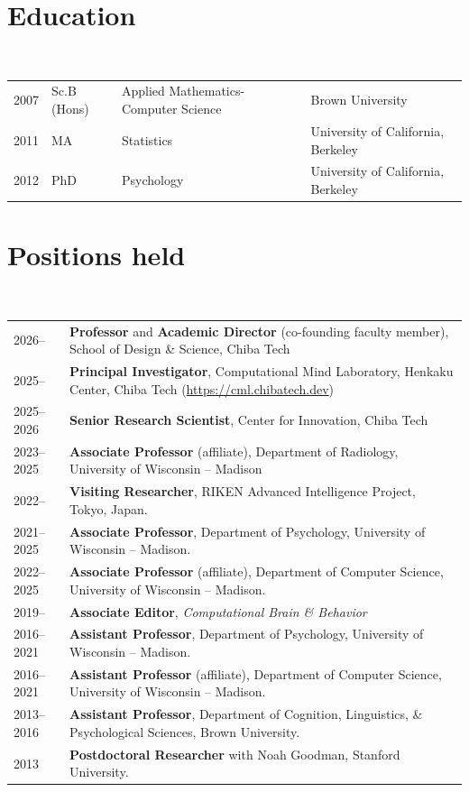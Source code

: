 \documentclass[a4paper,10pt]{article}
\begin{document}
\maketitle

\section{Education}

~\begin{tabular}{llll}
2007 & Sc.B (Hons) & Applied Mathematics-Computer Science & Brown University\\
2011 & MA & Statistics & University of California, Berkeley\\
2012 & PhD & Psychology & University of California, Berkeley
\end{tabular}


\section{Positions held}

~\begin{tabular}{lP{15cm}}
2026-- & \textbf{Professor} and \textbf{Academic Director} (co-founding faculty member), School of Design \& Science, Chiba Tech \\
2025-- & \textbf{Principal Investigator}, Computational Mind Laboratory, Henkaku Center, Chiba Tech (\url{https://cml.chibatech.dev}) \\
2025--2026 & \textbf{Senior Research Scientist}, Center for Innovation, Chiba Tech \\
2023--2025 & \textbf{Associate Professor} (affiliate), Department of Radiology, University of Wisconsin -- Madison \\
2022-- & \textbf{Visiting Researcher}, RIKEN Advanced Intelligence Project, Tokyo, Japan. \\
2021--2025& \textbf{Associate Professor}, Department of Psychology, University of Wisconsin -- Madison. \\
2022--2025& \textbf{Associate Professor} (affiliate), Department of Computer Science, University of Wisconsin -- Madison. \\
2019-- & \textbf{Associate Editor}, \textit{Computational Brain \& Behavior} \\
2016--2021& \textbf{Assistant Professor},
        Department of Psychology, University of Wisconsin -- Madison.\\
2016--2021& \textbf{Assistant Professor} (affiliate), Department of Computer Science, University of Wisconsin -- Madison. \\
2013--2016 & \textbf{Assistant Professor},
        Department of Cognition, Linguistics, \& Psychological Sciences, Brown University. \\ 
2013 & \textbf{Postdoctoral Researcher} with Noah Goodman, Stanford University. \\  \end{tabular}
\end{document}
